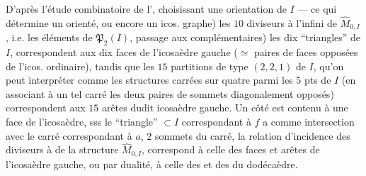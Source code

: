 
D'après l'étude combinatoire de l', choisissant une orientation de $I$ --- ce qui détermine un  orienté, ou encore un icos. graphe) les $10$ diviseurs à l'infini de $\widehat M_{0,I}$, i.e. les  éléments de $\mathfrak P_2(I)$,   
passage aux complémentaires) les dix ``triangles'' de $I$, correspondent aux dix faces de l'icosaèdre gauche ($\simeq$ paires de faces opposées de l'icos. ordinaire), tandis que les $15$ partitions de type $(2,2,1)$ de $I$, qu'on peut interpréter comme les structures carrées sur quatre parmi les $5$ pts de $I$
(en associant à un tel carré les deux paires de sommets diagonalement opposés) correspondent aux $15$ arêtes dudit icosaèdre gauche.
Un côté  est contenu  à une face  de l'icosaèdre, sss le ``triangle'' $\subset I$ correspondant à $f$ a comme intersection avec le carré correspondant à $a$,   $2$ sommets  du carré, 
 la relation d'incidence des diviseurs à  de la structure $\widehat M_{0,I}$, correspond à celle des faces et arêtes de l'icosaèdre gauche, ou par dualité, à celle des  et des  du dodécaèdre.

